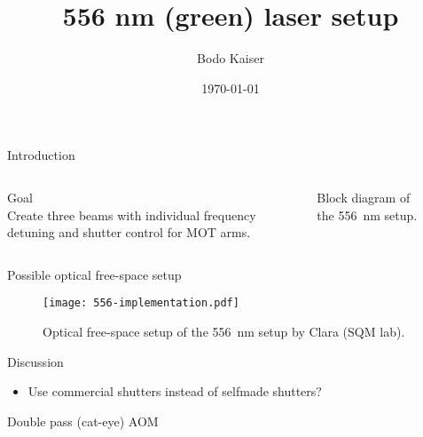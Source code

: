 \documentclass[aspectratio=169]{beamer}
\date{\today}
\author{Bodo Kaiser}
\institute{Ryd-Yb Lab}
\begin{document}
	\title{556 nm (green) laser setup}

	\maketitle
	
	\begin{frame}{Introduction}
	 \begin{columns}[T,onlytextwidth]
	    \begin{alertblock}{Goal\\}
		    Create three beams with individual frequency detuning and shutter control for MOT arms.
		\end{alertblock}

		\begin{figure}
			\centering
			\caption{Block diagram of the \SI{556}{\nano\meter} setup.}
		\end{figure}

	  \end{columns}
	\end{frame}
	
	\begin{frame}{Possible optical free-space setup}
		\begin{figure}
			\centering
			\texttt{[image: 556-implementation.pdf]}
			\caption{Optical free-space setup of the \SI{556}{\nano\meter} setup by Clara (SQM lab).}
		\end{figure}
	\end{frame}
	
	\begin{frame}{Discussion}
		\begin{itemize}
			\item Use commercial shutters instead of selfmade shutters?
		\end{itemize}
	\end{frame}
	
	\appendix
	
	\begin{frame}{Double pass (cat-eye) AOM}
		
	\end{frame}
\end{document}
